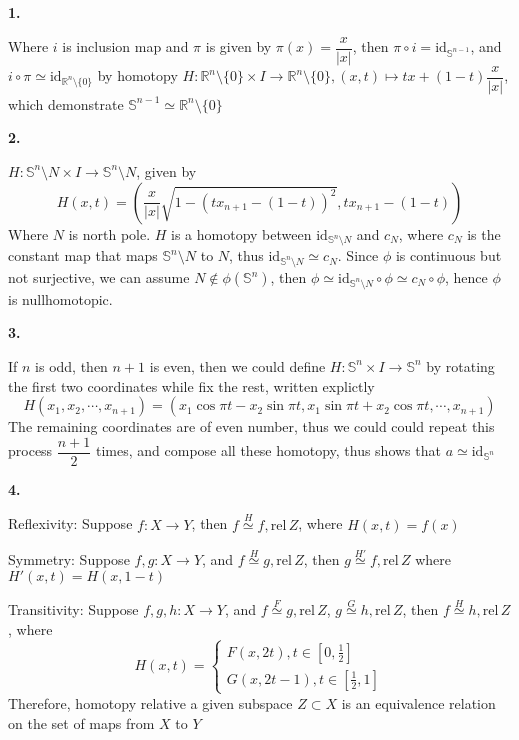 \documentclass[../main.tex]{subfiles}
\begin{document}
\textbf{1.} \par
\begin{center}
\end{center}
Where $i$ is inclusion map and $\pi$ is given by $\pi(x)=\dfrac{x}{|x|}$, then $\pi\circ i=\mathrm{id}_{\mathbb{S}^{n-1} }$, and $i\circ\pi\simeq\mathrm{id}_{\mathbb{R}^{n}\setminus\{0\} }$ by homotopy $H:\mathbb{R}^{n}\setminus\{0\}\times I \rightarrow \mathbb{R}^{n}\setminus\{0\}, (x,t)\mapsto tx+(1-t)\dfrac{x}{|x|}$, which demonstrate $\mathbb{S}^{n-1} \simeq\mathbb{R}^{n}\setminus\{0\} $ \par
\textbf{2.} \par
$H:\mathbb{S}^{n}\setminus N\times I\rightarrow\mathbb{S}^{n}\setminus N$, given by \[ H(x,t)=\left( \dfrac{x}{|x|}\sqrt{1-\left(tx_{n+1}-(1-t)\right)^{2}}, tx_{n+1}-(1-t) \right) \] Where $N$ is north pole.
$H$ is a homotopy between $\mathrm{id}_{\mathbb{S}^{n}\setminus N}$ and $c_{N}$, where $c_{N}$ is the constant map that maps $\mathbb{S}^{n}\setminus N$ to $N$, thus $\mathrm{id}_{\mathbb{S}^{n}\setminus N}\simeq c_{N}$. Since $\phi$ is continuous but not surjective, we can assume $N\notin \phi(\mathbb{S}^{n})$, then $\phi\simeq\mathrm{id}_{\mathbb{S}^{n}\setminus N}\circ\phi\simeq c_{N}\circ\phi$, hence $\phi$ is nullhomotopic. \par
\textbf{3.} \par
If $n$ is odd, then $n+1$ is even, then we could define $H:\mathbb{S}^{n}\times I\rightarrow \mathbb{S}^{n}$ by rotating the first two coordinates while fix the rest, written explictly \[H(x_{1},x_{2},\cdots,x_{n+1})=\left(x_{1}\cos{\pi t}-x_{2}\sin{\pi t}, x_{1}\sin{\pi t}+x_{2}\cos{\pi t}, \cdots, x_{n+1}\right)\] The remaining coordinates are of even number, thus we could could repeat this process $\dfrac{n+1}{2}$ times, and compose all these homotopy, thus shows that $a\simeq\mathrm{id}_{\mathbb{S}^{n}}$ \par
\textbf{4.} \par
Reflexivity: Suppose $f:X\rightarrow Y$, then \(f\overset{H}{\simeq}f,\mathrm{rel}\,Z\), where $H(x,t)=f(x)$ \par
Symmetry: Suppose $f,g:X\rightarrow Y$, and \(f\overset{H}{\simeq}g,\mathrm{rel}\,Z\), then \(g\overset{H'}{\simeq}f,\mathrm{rel}\,Z\) where $H'(x,t)=H(x,1-t)$ \par
Transitivity: Suppose $f,g,h:X\rightarrow Y$, and \(f\overset{F}{\simeq}g,\mathrm{rel}\,Z\),  \(g\overset{G}{\simeq}h,\mathrm{rel}\,Z\), then  \(f\overset{H}{\simeq}h,\mathrm{rel}\,Z\), where\[
H(x,t)=
\left\{\begin{matrix}
F\left(x,2t\right), t\in\left[0,\frac{1}{2}\right]\\ 
G\left(x,2t-1\right), t\in\left[\frac{1}{2},1\right]
\end{matrix}\right.
\]
Therefore, homotopy relative a given subspace $Z\subset X$ is an equivalence relation on the set of maps from $X$ to $Y$
\end{document}
